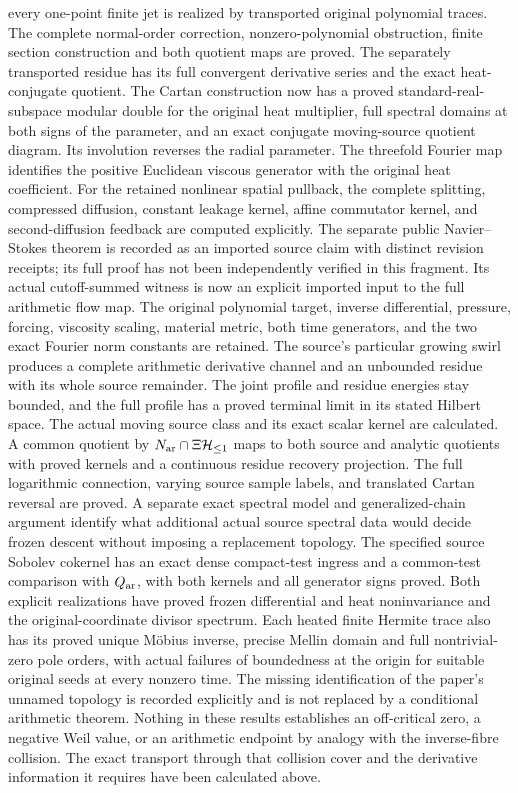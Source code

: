 every one-point finite jet is realized by transported original
polynomial traces. The complete normal-order correction,
nonzero-polynomial obstruction, finite section construction
and both quotient maps are proved. The separately transported
residue has its full convergent derivative series and the
exact heat-conjugate quotient.
The Cartan construction now has a proved standard-real-subspace
modular double for the original heat multiplier, full spectral
domains at both signs of the parameter, and an exact conjugate
moving-source quotient diagram. Its involution reverses the radial
parameter. The threefold Fourier map identifies the positive
Euclidean viscous generator with the original heat coefficient.
For the retained nonlinear spatial pullback, the complete splitting,
compressed diffusion, constant leakage kernel, affine commutator
kernel, and second-diffusion feedback are computed explicitly.
The separate public Navier--Stokes theorem is recorded as an
imported source claim with distinct revision receipts; its full
proof has not been independently verified in this fragment.
Its actual cutoff-summed witness is now an explicit imported
input to the full arithmetic flow map. The original polynomial
target, inverse differential, pressure, forcing, viscosity scaling,
material metric, both time generators, and the two exact Fourier
norm constants are retained. The source's particular growing
swirl produces a complete arithmetic derivative channel and an
unbounded residue with its whole source remainder. The joint
profile and residue energies stay bounded, and the full profile
has a proved terminal limit in its stated Hilbert space.
The actual moving source class and its exact scalar kernel are
calculated. A common quotient by $N_{\rm ar}\cap\Xi\mathcal H_{\leq 1}$ maps to both
source and analytic quotients with proved kernels and a continuous
residue recovery projection. The full logarithmic connection,
varying source sample labels, and translated Cartan reversal
are proved. A separate exact spectral model and generalized-chain
argument identify what additional actual source spectral data
would decide frozen descent without imposing a replacement topology.
The specified source Sobolev cokernel has an exact dense
compact-test ingress and a common-test comparison with $Q_{\rm ar}$,
with both kernels and all generator signs proved.
Both explicit realizations have proved frozen differential and
heat noninvariance and the original-coordinate divisor spectrum.
Each heated finite Hermite trace also has its proved unique
M\"obius inverse, precise Mellin domain and full nontrivial-zero
pole orders, with actual failures of boundedness at the origin
for suitable original seeds at every nonzero time.
The missing identification of the paper's unnamed topology is
recorded explicitly and is not replaced by a conditional arithmetic
theorem. Nothing in these results establishes an off-critical zero,
a negative Weil value, or an arithmetic endpoint by analogy with
the inverse-fibre collision. The exact transport through that
collision cover and the derivative information it requires have
been calculated above.

